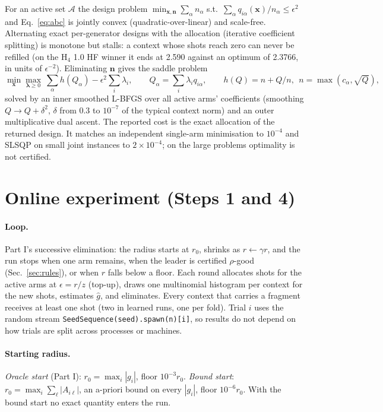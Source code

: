 \documentclass[10.5pt]{article}
\newcommand{\code}[1]{\texttt{#1}}
\begin{document}
For an active set $\mathcal A$ the design problem $\min_{\bm x,\bm n}\sum_\alpha n_\alpha$ s.t.\ $\sum_\alpha q_{i\alpha}(\bm x)/n_\alpha\le\epsilon^2$ and Eq.~\eqref{eq:abc} is jointly convex (quadratic-over-linear) and scale-free. Alternating exact per-generator designs with the allocation (iterative coefficient splitting) is monotone but stalls: a context whose shots reach zero can never be refilled (on the H$_4$ 1.0 HF winner it ends at 2.590 against an optimum of 2.3766, in units of $\epsilon^{-2}$). Eliminating $\bm n$ gives the saddle problem
\[
  \min_{\bm x}\max_{\bm\lambda\ge0}\ \sum_\alpha h(Q_\alpha)-\epsilon^2\sum_i\lambda_i,
  \qquad Q_\alpha=\sum_i\lambda_iq_{i\alpha},
  \qquad h(Q)=n+Q/n,\ \ n=\max(c_\alpha,\sqrt Q),
\]
solved by an inner smoothed L-BFGS over all active arms' coefficients (smoothing $Q\to Q+\delta^2$, $\delta$ from $0.3$ to $10^{-7}$ of the typical context norm) and an outer multiplicative dual ascent. The reported cost is the exact allocation of the returned design. It matches an independent single-arm minimisation to $10^{-4}$ and SLSQP on small joint instances to $2\times10^{-4}$; on the large problems optimality is not certified.

\section{Online experiment (Steps 1 and 4)}
\label{sec:online}

\paragraph{Loop.}
Part I's successive elimination: the radius starts at $r_0$, shrinks as $r\leftarrow\gamma r$, and the run stops when one arm remains, when the leader is certified $\rho$-good (Sec.~\ref{sec:rules}), or when $r$ falls below a floor. Each round allocates shots for the active arms at $\epsilon=r/z$ (top-up), draws one multinomial histogram per context for the new shots, estimates $\hat g$, and eliminates. Every context that carries a fragment receives at least one shot (two in learned runs, one per fold). Trial $i$ uses the random stream \code{SeedSequence(seed).spawn(n)[i]}, so results do not depend on how trials are split across processes or machines.

\paragraph{Starting radius.}
\emph{Oracle start} (Part I): $r_0=\max_i|g_i|$, floor $10^{-3}r_0$. \emph{Bound start}: $r_0=\max_i\sum_\ell|A_{i\ell}|$, an a-priori bound on every $|g_i|$, floor $10^{-6}r_0$. With the bound start no exact quantity enters the run.
\end{document}
